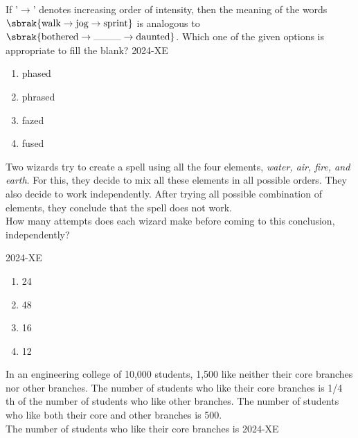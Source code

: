 \iffalse
\section{xe}
\chapter{2024}
\author{ai24btech11036}
\fi


	\item If '$\to$' denotes increasing order of intensity, then the meaning of the words $\sbrak{\text{walk} \to \text{jog} \to \text{sprint}}$ is analogous to $\sbrak{\text{bothered} \to \rule{1cm}{0.2pt} \to \text{daunted}}$. Which one of the given options is appropriate to fill the blank?
		\hfill{2024-XE}
	\begin{enumerate}
	\item phased 
	\item phrased
	\item fazed
	\item fused
	\end{enumerate}

\item Two wizards try to create a spell using all the four elements, \textit{water, air, fire, and earth}. For this, they decide to mix all these elements in all possible orders. They also decide to work independently. After trying all possible combination of elements, they conclude that the spell does not work. \\
How many attempts does each wizard make before coming to this conclusion,
independently?

\hfill{2024-XE}


	\begin{enumerate}
		\item 24
		\item 48
		\item 16
		\item 12
	\end{enumerate}

\item In an engineering college of 10,000 students, 1,500 like neither their core branches nor other branches. The number of students who like their core branches is 1/4 th of the number of students who like other branches. The number of students who like both their core and other branches is 500. \\
The number of students who like their core branches is
\hfill{2024-XE}

